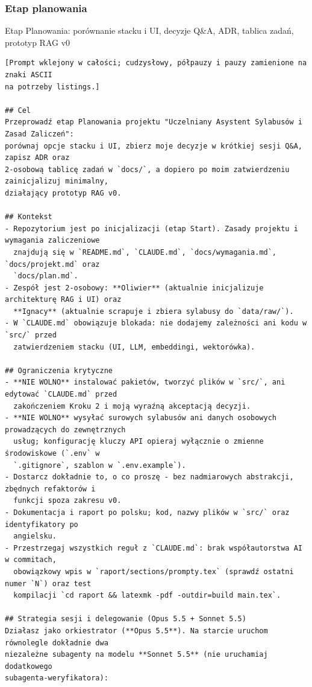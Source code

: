 \subsubsection*{Etap planowania}

  {Etap Planowania: porównanie stacku i UI, decyzje Q\&A, ADR, tablica zadań, prototyp RAG v0}
\begin{lstlisting}
[Prompt wklejony w całości; cudzysłowy, półpauzy i pauzy zamienione na znaki ASCII
na potrzeby listings.]

## Cel
Przeprowadź etap Planowania projektu "Uczelniany Asystent Sylabusów i Zasad Zaliczeń":
porównaj opcje stacku i UI, zbierz moje decyzje w krótkiej sesji Q&A, zapisz ADR oraz
2-osobową tablicę zadań w `docs/`, a dopiero po moim zatwierdzeniu zainicjalizuj minimalny,
działający prototyp RAG v0.

## Kontekst
- Repozytorium jest po inicjalizacji (etap Start). Zasady projektu i wymagania zaliczeniowe
  znajdują się w `README.md`, `CLAUDE.md`, `docs/wymagania.md`, `docs/projekt.md` oraz
  `docs/plan.md`.
- Zespół jest 2-osobowy: **Oliwier** (aktualnie inicjalizuje architekturę RAG i UI) oraz
  **Ignacy** (aktualnie scrapuje i zbiera sylabusy do `data/raw/`).
- W `CLAUDE.md` obowiązuje blokada: nie dodajemy zależności ani kodu w `src/` przed
  zatwierdzeniem stacku (UI, LLM, embeddingi, wektorówka).

## Ograniczenia krytyczne
- **NIE WOLNO** instalować pakietów, tworzyć plików w `src/`, ani edytować `CLAUDE.md` przed
  zakończeniem Kroku 2 i moją wyraźną akceptacją decyzji.
- **NIE WOLNO** wysyłać surowych sylabusów ani danych osobowych prowadzących do zewnętrznych
  usług; konfigurację kluczy API opieraj wyłącznie o zmienne środowiskowe (`.env` w
  `.gitignore`, szablon w `.env.example`).
- Dostarcz dokładnie to, o co proszę - bez nadmiarowych abstrakcji, zbędnych refaktorów i
  funkcji spoza zakresu v0.
- Dokumentacja i raport po polsku; kod, nazwy plików w `src/` oraz identyfikatory po
  angielsku.
- Przestrzegaj wszystkich reguł z `CLAUDE.md`: brak współautorstwa AI w commitach,
  obowiązkowy wpis w `raport/sections/prompty.tex` (sprawdź ostatni numer `N`) oraz test
  kompilacji `cd raport && latexmk -pdf -outdir=build main.tex`.

## Strategia sesji i delegowanie (Opus 5.5 + Sonnet 5.5)
Działasz jako orkiestrator (**Opus 5.5**). Na starcie uruchom równolegle dokładnie dwa
niezależne subagenty na modelu **Sonnet 5.5** (nie uruchamiaj dodatkowego
subagenta-weryfikatora):


\end{lstlisting}
